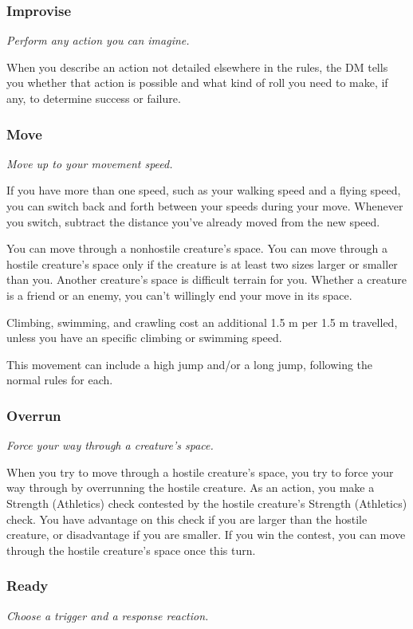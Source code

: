\subsubsection{Improvise}
    \textit{Perform any action you can imagine.}

    When you describe an action not detailed elsewhere in the rules, the DM tells you whether that action is possible and what kind of roll you need to make, if any, to determine success or failure.
\subsubsection{Move}
    \textit{Move up to your movement speed.}

    If you have more than one speed, such as your walking speed and a flying speed, you can switch back and forth between your speeds during your move.
    Whenever you switch, subtract the distance you've already moved from the new speed.

    You can move through a nonhostile creature's space.
    You can move through a hostile creature's space only if the creature is at least two sizes larger or smaller than you.
    Another creature's space is difficult terrain for you.
    Whether a creature is a friend or an enemy, you can't willingly end your move in its space.

    Climbing, swimming, and crawling cost an additional 1.5 m per 1.5 m travelled, unless you have an specific climbing or swimming speed.

    This movement can include a high jump and/or a long jump, following the normal rules for each.
\subsubsection{Overrun}
    \textit{Force your way through a creature's space.}

    When you try to move through a hostile creature's space, you try to force your way through by overrunning the hostile creature.
    As an action, you make a Strength (Athletics) check contested by the hostile creature's Strength (Athletics) check.
    You have advantage on this check if you are larger than the hostile creature, or disadvantage if you are smaller.
    If you win the contest, you can move through the hostile creature's space once this turn.
\subsubsection{Ready}
    \textit{Choose a trigger and a response reaction.}

